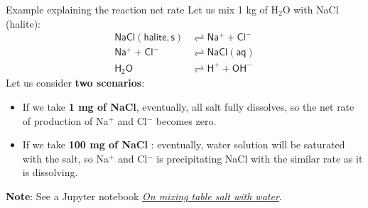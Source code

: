 %
\begin{frame}{Example explaining the reaction net rate}
%
Let us mix 1 kg of H$_{2}$O with NaCl (halite):\\[-20pt] 
%
\begin{align*}
\mathsf{NaCl(halite, s)} & \rightleftharpoons\mathsf{Na^{+}+Cl^{-}}\\[-1pt]
\mathsf{Na^{+}+Cl^{-}} & \rightleftharpoons\mathsf{NaCl(aq)}\\[-1pt]
\mathsf{H_{2}O} & \rightleftharpoons\mathsf{H^{+}+OH^{-}}
\end{align*}
%
\vskip -5pt
\pause
Let us consider \textbf{two scenarios}:
\begin{itemize}
%
\item If we take \alert{\textbf{1 mg of NaCl}}, eventually, all salt fully dissolves, so the net rate of production of Na$^{+}$ and Cl$^-$ becomes zero.
%
\pause
\item If we take \alert{\textbf{100 mg of NaCl }}: eventually, water solution will be saturated with the salt, so Na$^{+}$ and Cl$^-$  is precipitating NaCl with the similar rate as it is dissolving.
\end{itemize}
\pause
\alert{\textbf{Note}}: See a Jupyter notebook \href{https://github.com/mtsveta/reaktoro-v2-workshop/blob/main/tutorials/solubility/solubility-tablesalt-water.ipynb}{\textcolor{indigo(dye)}{\it On mixing table salt with water}}.

\end{frame}
%
%
